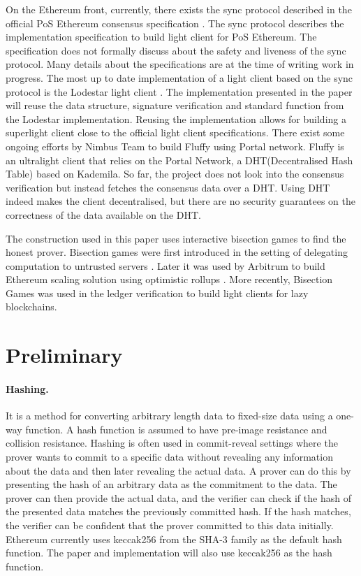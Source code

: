 \documentclass[a4paper,11pt,oneside]{article}
\theoremstyle{definition}
\begin{document}
  On the Ethereum front, currently, there exists the sync protocol described in the official PoS Ethereum consensus specification \cite{EthereumConcensusSpecs}. The sync protocol describes the implementation specification to build light client for PoS Ethereum. The specification does not formally discuss about the safety and liveness of the sync protocol. Many details about the specifications are at the time of writing work in progress. The most up to date implementation of a light client based on the sync protocol is the Lodestar light client \cite{LodestarLightClient}. The implementation presented in the paper will reuse the data structure, signature verification and standard function from the Lodestar implementation. Reusing the implementation allows for building a superlight client close to the official light client specifications. There exist some ongoing efforts by Nimbus Team to build Fluffy using Portal network\cite{Fluffy}. Fluffy is an ultralight client that relies on the Portal Network, a DHT(Decentralised Hash Table) based on Kademila. So far, the project does not look into the consensus verification but instead fetches the consensus data over a DHT. Using DHT indeed makes the client decentralised, but there are no security guarantees on the correctness of the data available on the DHT.  
  
  The construction used in this paper uses interactive bisection games to find the honest prover. Bisection games were first introduced in the setting of delegating computation to untrusted servers \cite{ComputationDelegation}. Later it was used by Arbitrum to build Ethereum scaling solution using optimistic rollups \cite{Arbitrum}. More recently, Bisection Games was used in the ledger verification to build light clients for lazy blockchains\cite{LazyLightClients}.  
  

  \section{Preliminary}
  \paragraph{Hashing.} It is a method for converting arbitrary length data to fixed-size data using a one-way function. A hash function is assumed to have pre-image resistance and collision resistance. Hashing is often used in commit-reveal settings where the prover wants to commit to a specific data without revealing any information about the data and then later revealing the actual data. A prover can do this by presenting the hash of an arbitrary data as the commitment to the data. The prover can then provide the actual data, and the verifier can check if the hash of the presented data matches the previously committed hash. If the hash matches, the verifier can be confident that the prover committed to this data initially. Ethereum currently uses keccak256\cite{Keccak} from the SHA-3 family\cite{EthereumYellowPaper} as the default hash function. The paper and implementation will also use keccak256 as the hash function.
  
\end{document}
